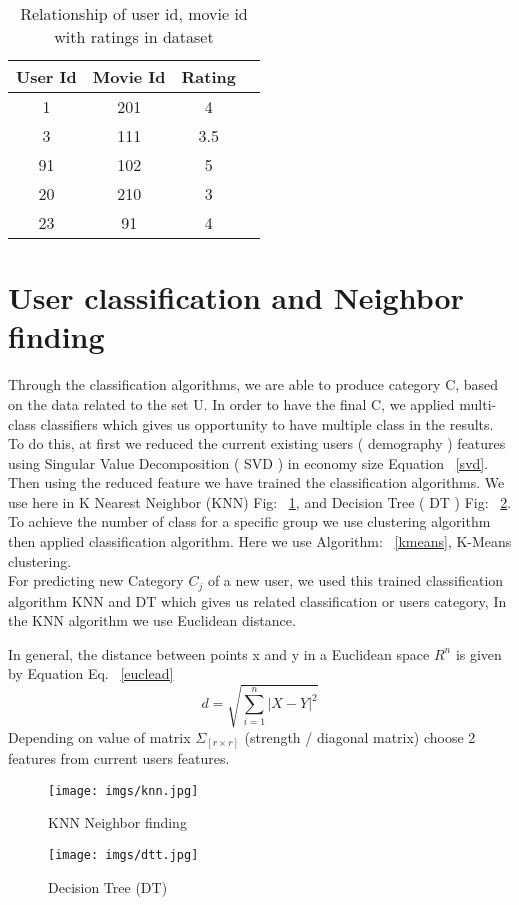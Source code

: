 \documentclass[document.tex]{subfiles}
\begin{document}
\begin{table}[htb]
	\begin{center}
		\begin{tabular}{ |c|c|c|c| } 
			\hline 
			User Id & Movie Id & Rating \\
			\hline
			1 &	201 & 4\\
			3 &	111	& 3.5\\
			91 & 102 & 5\\
			20 & 210 & 3\\
			23 & 91 & 4\\
			
			\hline
		\end{tabular}
		\caption{Relationship of user id, movie id with ratings in dataset}
		\label{table2}
	\end{center}
	
\end{table}

\section{User classification and Neighbor finding}
Through the classification algorithms, we are able to produce category C, based on the data related to the set U. In order to have the final C, we applied multi-class classifiers which gives us opportunity to have multiple class in the results. To do this, at first we reduced the current  existing users ( demography ) features using Singular Value Decomposition ( SVD ) in economy size Equation ~\ref{svd}. 
Then using the reduced feature we have trained the classification algorithms. We use here in K Nearest Neighbor (KNN) Fig: ~\ref{knn}, 
and Decision Tree ( DT ) Fig: ~\ref{dtt}. 
To achieve the number of class for a specific group we use clustering algorithm then applied classification algorithm. Here we use Algorithm: ~\ref{kmeans},  K-Means clustering. \\
For predicting new Category $C_j$ of a new user, we used this trained classification algorithm KNN and DT which gives us related classification or users category, In the KNN algorithm we use Euclidean distance.

In general, the distance between points x and y in a Euclidean space \textit{$R^n$} is given by Equation Eq. ~\ref{euclead}
\begin{equation}
d =\sqrt{\sum_{i=1}^n |X-Y|^2}
\label{euclead}
\end{equation}
Depending on value of matrix $\Sigma_{[r \times r]}$ (strength / diagonal matrix) choose 2 features from current users features.
\begin{figure}[H]
	\centering
	\texttt{[image: imgs/knn.jpg]}
	\caption[KNN Neighbor finding]
	{KNN Neighbor finding}
	\label{knn}
\end{figure}
\begin{figure}[H]
	\centering
	\texttt{[image: imgs/dtt.jpg]}
	\caption[Decision Tree (DT)]
	{Decision Tree (DT)}
	\label{dtt}
\end{figure}
\end{document}
